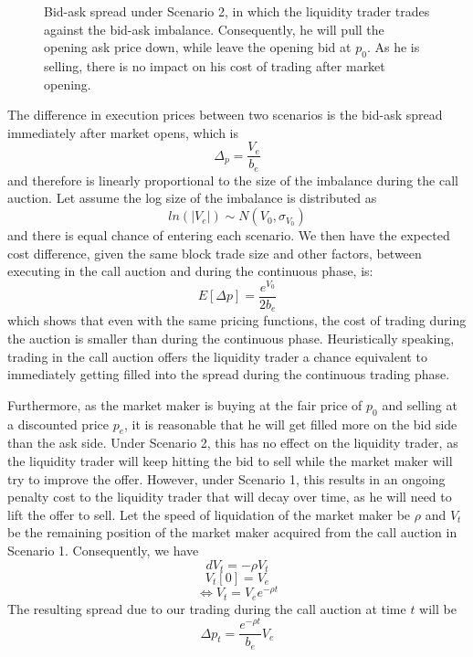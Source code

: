 \documentclass{article}
\begin{document}
\begin{itemize}
{\begin{figure}[h]
          \caption{Bid-ask spread under Scenario 2, in which the liquidity trader trades against the bid-ask imbalance. Consequently, he will pull the opening ask price down, while leave the opening bid at $p_0$. As he is selling, there is no impact on his cost of trading after market opening.}
          \label{fig:mm_pricing_transition}
        \end{figure}
        }
\end{itemize}
The difference in execution prices between two scenarios is the bid-ask spread immediately after market opens, which is
\[
  \Delta_p = \frac{V_e}{b_e}
\]
and therefore is linearly proportional to the size of the imbalance during the call auction. Let assume the log size of the imbalance is distributed as
\[
  ln(|V_e|) \sim N(V_0, \sigma_{V_0})
\]
and there is equal chance of entering each scenario. We then have the expected cost difference, given the same block trade size and other factors, between executing in the call auction and during the continuous phase, is:
\begin{equation}\label{eqn:expected_auction_saving}
  E[\Delta p] =  \frac{e^{V_0}}{2 b_e}
\end{equation}
which shows that even with the same pricing functions, the cost of trading during the auction is smaller than during the continuous phase. Heuristically speaking, trading in the call auction offers the liquidity trader a chance equivalent to immediately getting filled into the spread during the continuous trading phase.

Furthermore, as the market maker is buying at the fair price of $p_0$ and selling at a discounted price $p_e$, it is reasonable that he will get filled more on the bid side than the ask side. Under Scenario 2, this has no effect on the liquidity trader, as the liquidity trader will keep hitting the bid to sell while the market maker will try to improve the offer. However, under Scenario 1, this results in an ongoing penalty cost to the liquidity trader that will decay over time, as he will need to lift the offer to sell. Let the speed of liquidation of the market maker be $\rho$ and $V_t$ be the remaining position of the market maker acquired from the call auction in Scenario 1. Consequently, we have
\[
  dV_t = -\rho V_t
\]
\[
  V_t[0]=V_e
\]
\[
  \Leftrightarrow V_t = V_e e^{-\rho t}
\]
The resulting spread due to our trading during the call auction at time $t$ will be
\begin{equation}\label{resilence_term}
  \Delta p_t = \frac{e^{-\rho t}}{b_e}  V_e
\end{equation}
\end{document}
